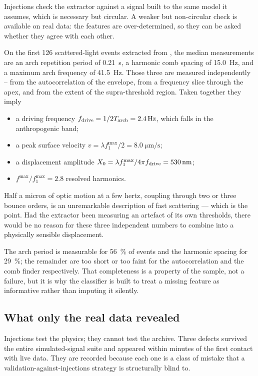 Injections check the extractor against a signal built to the same model it
assumes, which is necessary but circular. A weaker but non-circular check is
available on real data: the features are over-determined, so they can be asked
whether they agree with each other.

On the first \num{126} scattered-light events extracted from \Hone{} \Otza,
the median measurements are an arch repetition period of \SI{0.21}{\second}, a
harmonic comb spacing of \SI{15.0}{\hertz}, and a maximum arch frequency of
\SI{41.5}{\hertz}. Those three are measured independently -- from the
autocorrelation of the envelope, from a frequency slice through the apex, and
from the extent of the supra-threshold region. Taken together they imply

\begin{itemize}
  \item a driving frequency $f_{\mathrm{drive}} = 1/2T_{\mathrm{arch}} = \SI{2.4}{\hertz}$, which
        falls in the anthropogenic band;
  \item a peak surface velocity $v = \lambda f_1^{\max} / 2 =
        \SI{8.0}{\micro\metre\per\second}$;
  \item a displacement amplitude $X_0 = \lambda f_1^{\max} / 4\pi f_{\mathrm{drive}} =
        \SI{530}{\nano\metre}$;
  \item $f^{\max}/f_1^{\max} = 2.8$ resolved harmonics.
\end{itemize}

Half a micron of optic motion at a few hertz, coupling through two or three
bounce orders, is an unremarkable description of fast scattering --- which is
the point. Had the extractor been measuring an artefact of its own thresholds,
there would be no reason for these three independent numbers to combine into a
physically sensible displacement.

The arch period is measurable for \SI{56}{\percent} of events and the harmonic
spacing for \SI{29}{\percent}; the remainder are too short or too faint for the
autocorrelation and the comb finder respectively. That completeness is a
property of the sample, not a failure, but it is why the classifier is built to
treat a missing feature as informative rather than imputing it silently.

\subsection{What only the real data revealed}
\label{sec:validation:realdata}

Injections test the physics; they cannot test the archive. Three defects
survived the entire simulated-signal suite and appeared within minutes of the
first contact with live data. They are recorded because each one is a class of
mistake that a validation-against-injections strategy is structurally blind
to.

